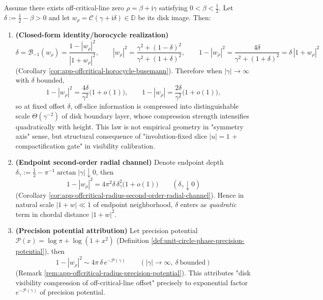 \begin{theorem}\label{thm:xi-offcritical-quadratic-radial-compression}
Assume there exists off-critical-line zero \(\rho=\beta+\mathrm{i}\gamma\) satisfying \(0<\beta<\tfrac12\).
Let
\(
\delta:=\tfrac12-\beta>0
\)
and let \(w_\rho=\mathcal{C}(\gamma+\mathrm{i}\delta)\in\mathbb{D}\) be its disk image.
Then:
\begin{enumerate}
  \item \textbf{(Closed-form identity/horocycle realization)}
  \[
  \delta=\mathcal{B}_{-1}(w_\rho)=\frac{1-|w_\rho|^2}{|1+w_\rho|^2},
  \qquad
  |w_\rho|^2=\frac{\gamma^2+(1-\delta)^2}{\gamma^2+(1+\delta)^2},
  \qquad
  1-|w_\rho|^2=\frac{4\delta}{\gamma^2+(1+\delta)^2}=\delta\,|1+w_\rho|^2
  \]
  (Corollary \ref{cor:app-offcritical-horocycle-busemann}).
  Therefore when \(|\gamma|\to\infty\) with \(\delta\) bounded,
  \[
  1-|w_\rho|^{2}=\frac{4\delta}{\gamma^{2}}\bigl(1+o(1)\bigr),
  \qquad
  1-|w_\rho|=\frac{2\delta}{\gamma^{2}}\bigl(1+o(1)\bigr),
  \]
  so at fixed offset \(\delta\), off-slice information is compressed into distinguishable scale \(\Theta(\gamma^{-2})\) of disk boundary layer, whose compression strength intensifies quadratically with height.
  This law is not empirical geometry in "symmetry axis" sense, but structural consequence of "involution-fixed slice \(|u|=1\) + compactification gate" in visibility calibration.
  \item \textbf{(Endpoint second-order radial channel)}
  Denote endpoint depth \(\delta_\gamma:=\tfrac12-\pi^{-1}\arctan|\gamma|\downarrow 0\), then
  \[
  1-|w_\rho|^2
  =4\pi^2\delta\,\delta_\gamma^2\bigl(1+o(1)\bigr)\qquad(\delta_\gamma\downarrow 0)
  \]
  (Corollary \ref{cor:app-offcritical-radius-second-order-radial-channel}).
  Hence in natural scale \(|1+w|\ll 1\) of endpoint neighborhood, \(\delta\) enters as \emph{quadratic} term in chordal distance \(|1+w|^2\).
  \item \textbf{(Precision potential attribution)}
  Let precision potential \(\mathcal{P}(x)=\log\pi+\log(1+x^2)\) (Definition \ref{def:unit-circle-phase-precision-potential}), then
  \[
  1-|w_\rho|^2\sim 4\pi\,\delta\,e^{-\mathcal{P}(\gamma)}\qquad(|\gamma|\to\infty,\ \delta\ \text{bounded})
  \]
  (Remark \ref{rem:app-offcritical-radius-precision-potential}).
  This attributes "disk visibility compression of off-critical-line offset" precisely to exponential factor \(e^{-\mathcal{P}(\gamma)}\) of precision potential.
\end{enumerate}
\end{theorem}

